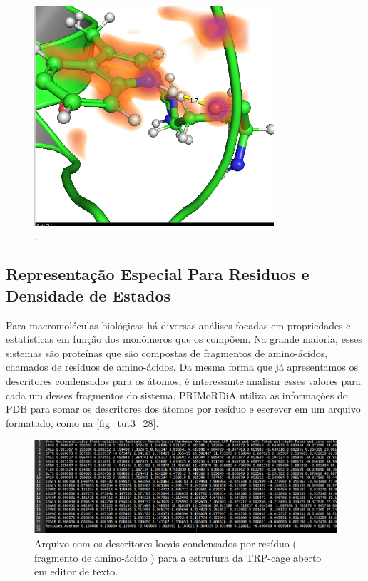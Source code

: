 \documentclass[a4paper,11pt]{refart}
\begin{document}
\hspace*{-\leftmarginwidth}
\begin{minipage}{\fullwidth}
	\begin{figure}[H]
		\begin{center}
			\includegraphics[width=3.5in]{images/tut3_img28}
			\caption{.}
			\label{fig_tut3_27}
		\end{center}
	\end{figure}
\end{minipage}

\subsection{Representação Especial Para Residuos e Densidade de Estados}

Para macromoléculas biológicas há diversas análises focadas em propriedades e estatísticas em função dos monômeros que os compõem. Na grande maioria, esses sistemas são proteínas que são compostas de fragmentos de amino-ácidos, chamados de resíduos de amino-ácidos. Da mesma forma que já apresentamos os descritores condensados para os átomos, é interessante analisar esses valores para cada um desses fragmentos do sistema. PRIMoRDiA utiliza as informações do PDB para somar os descritores dos átomos por resíduo e escrever em um arquivo formatado, como na \autoref{fig_tut3_28}. 

\hspace*{-\leftmarginwidth}
\begin{minipage}{\fullwidth}
	\begin{figure}[H]
		\begin{center}
			\includegraphics[width=6in]{images/tut3_img29}
			\caption{Arquivo com os descritores locais condensados por resíduo ( fragmento de amino-ácido ) para a estrutura da TRP-cage aberto em editor de texto.}
			\label{fig_tut3_28}
		\end{center}
	\end{figure}
\end{minipage}
\end{document}
